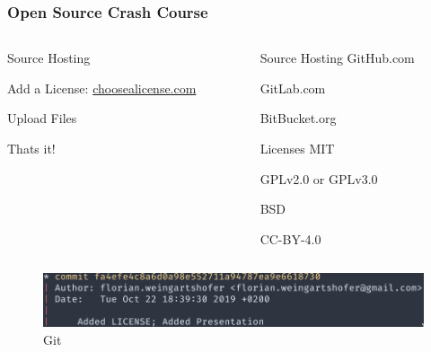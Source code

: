 \documentclass{beamer}
\begin{document}
\begin{frame}
  \frametitle{Open Source Crash Course}
  \begin{columns}
    \begin{column}{0.4\textwidth}
      \Large
      Source Hosting

      Add a License: \href{https://choosealicense.com/}
      {choosealicense.com}

      Upload Files

      Thats it!
    \end{column}
    \begin{column}{0.3\textwidth}
      \begin{block}{Source Hosting}
        GitHub.com

        GitLab.com

        BitBucket.org
      \end{block}      
      \begin{block}{Licenses}
        MIT

        GPLv2.0 or GPLv3.0

        BSD

        CC-BY-4.0
      \end{block}      
    \end{column}
  \end{columns}
  \begin{figure}
    \includegraphics[scale=0.3]{./img/git.png}
      \caption{Git}
    \end{figure}
\end{frame}
\end{document}
